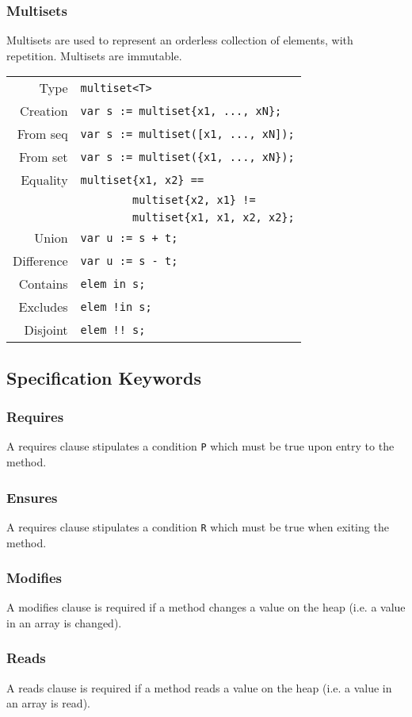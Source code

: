 \subsubsection{Multisets}
Multisets are used to represent an orderless collection of elements, with repetition. Multisets are immutable.
\begin{tabular}{r@{\hspace{0.1cm}}l@{}}
        Type & \verb!multiset<T>!\\
        Creation & \verb!var s := multiset{x1, ..., xN};!\\
        From seq & \verb!var s := multiset([x1, ..., xN]);!\\
        From set & \verb!var s := multiset({x1, ..., xN});!\\
        Equality & \verb!multiset{x1, x2} == !\\
                & \verb|        multiset{x2, x1} !=|\\
                & \verb!        multiset{x1, x1, x2, x2};!\\
        Union & \verb!var u := s + t;!\\
        Difference & \verb!var u := s - t;!\\
        Contains & \verb!elem in s;!\\
        Excludes & \verb|elem !in s;|\\
        Disjoint & \verb|elem !! s;|
\end{tabular}

\subsection{Specification Keywords}
\subsubsection{Requires}
A requires clause stipulates a condition \verb!P! which must be true upon entry to the method.
\subsubsection{Ensures}
A requires clause stipulates a condition \verb!R! which must be true when exiting the method.
\subsubsection{Modifies}
A modifies clause is required if a method changes a value on the heap (i.e. a value in an array is changed).
\subsubsection{Reads}
A reads clause is required if a method reads a value on the heap (i.e. a value in an array is read).
